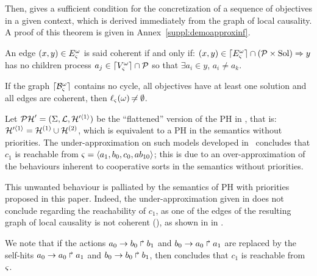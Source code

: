 Then,  gives a sufficient condition for the concretization of a sequence of objectives in a given context,
which is derived immediately from the graph of local causality.
A proof of this theorem is given in Annex~\ref{suppl:demoapproxinf}.
\begin{definition}
\label{def:coherent}
  An edge $(x, y) \in E_\varsigma^\omega$ is said coherent if and only if:
  $(x, y) \in \lceil E_\varsigma^\omega\rceil \cap (\mathcal{P} \times \mathrm{Sol}) \Rightarrow y$ has no children process $a_j \in \lceil V_\varsigma^\omega\rceil \cap \mathcal{P}$ so that $\exists a_i \in y$, $a_i \neq a_k$.
\end{definition}

\begin{theorem}
\label{th:approxinf}
  If the graph $\lceil \mathcal{B}_\varsigma^\omega\rceil$ contains no cycle,
  all objectives have at least one solution
  and all edges are coherent,
  then $\ell_\varsigma(\omega) \not\nobreak\mkern -2mu = \emptyset$.
\end{theorem}



\begin{example}
  Let $\mathcal{PH}' = (\Sigma, \mathcal{L}, \mathcal{H}'^{\langle 1 \rangle})$ be the “flattened” version of the PH in , that is: $\mathcal{H}'^{\langle 1 \rangle} = \mathcal{H}^{(1)} \cup \mathcal{H}^{(2)}$,
  which is equivalent to a PH in the semantics without priorities.
  The under-approximation on such models developed in~\cite{PMR12-MSCS} concludes that $c_1$ is reachable from $\varsigma = \mbox{$\langle a_1, b_0, c_0, ab_{10} \rangle$}$;
  this is due to an over-approximation of the behaviours inherent to cooperative sorts in the semantics without priorities.
  
  This unwanted behaviour is palliated by the semantics of PH with priorities proposed in this paper.
  Indeed, the under-approximation given in  does not conclude regarding the reachability of $c_1$,
  as one of the edges of the resulting graph of local causality is not coherent (),
  as shown in in .
  
  We note that if the actions $a_0\rightarrow b_0\Rsh b_1$ and $b_0\rightarrow a_0\Rsh a_1$ are replaced by the self-hits
  $a_0\rightarrow a_0\Rsh a_1$ and $b_0\rightarrow b_0\Rsh b_1$,
  then  concludes that $c_1$ is reachable from $\varsigma$.
\end{example}

